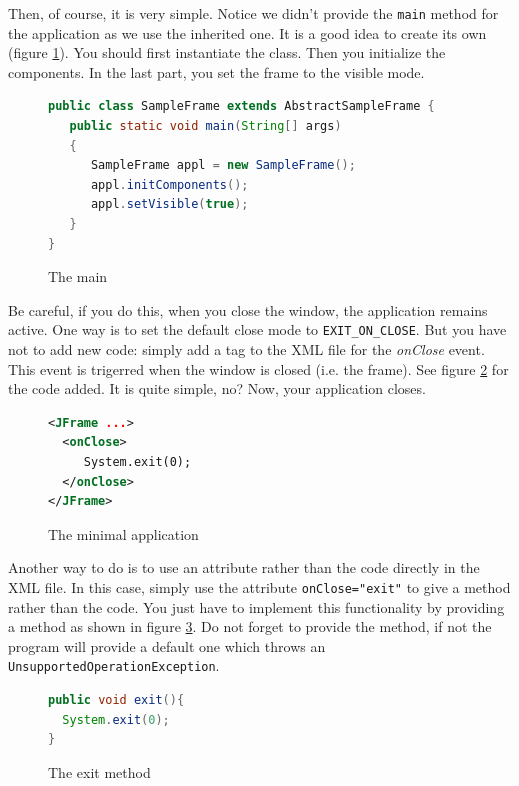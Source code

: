 Then, of course, it is very simple. Notice we didn't provide
the \verb|main| method for the application as we use the inherited one.
It is a good idea to create its own (figure \ref{fig:main}). You should
first instantiate the class. Then you initialize the components. In the last part, you set the frame to the visible mode.

\begin{figure}[htb]
\begin{lstlisting}[language=java]
public class SampleFrame extends AbstractSampleFrame {
   public static void main(String[] args)
   {
      SampleFrame appl = new SampleFrame();
      appl.initComponents();
      appl.setVisible(true);
   }
}
\end{lstlisting}
\caption{The main}\label{fig:main}
\end{figure}

Be careful, if you do this, when you close the window, the application
remains active. One way is to set the default close mode to
\verb|EXIT_ON_CLOSE|. But you have not to add new code: simply
add a tag to the XML file for the \emph{onClose} event. This event
is trigerred when the window is closed (i.e. the frame). See figure
\ref{fig:onclose} for the code added. It is quite simple, no? Now, your
application closes.

\begin{figure}[htb]
\begin{lstlisting}[language=XML]
<JFrame ...>
  <onClose>
     System.exit(0);
  </onClose>
</JFrame>
\end{lstlisting}
\caption{The minimal application}\label{fig:onclose}
\end{figure}

Another way to do is to use an attribute rather than the code
directly in the XML file. In this case, simply use the attribute
\verb|onClose="exit"| to give a method rather than the code.
You just have to implement this functionality by providing a
method as shown in figure \ref{fig:exitMethod}. Do not forget to
provide the method, if not the program will provide a default one
which throws an \verb|UnsupportedOperationException|.

\begin{figure}[htb]
\begin{lstlisting}[language=java]
public void exit(){
  System.exit(0);
}
\end{lstlisting}
\caption{The exit method}\label{fig:exitMethod}
\end{figure}

